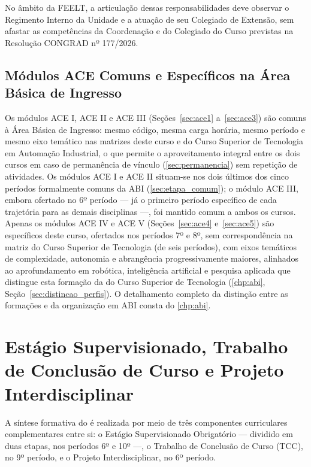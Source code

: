 No âmbito da FEELT, a articulação dessas responsabilidades deve observar o Regimento Interno da Unidade e a atuação de seu Colegiado de Extensão, sem afastar as competências da Coordenação e do Colegiado do Curso previstas na Resolução CONGRAD nº 177/2026.

\subsection{Módulos ACE Comuns e Específicos na Área Básica de Ingresso}
\label{sec:ace_abi}

Os módulos ACE I, ACE II e ACE III (Seções~\ref{sec:ace1} a~\ref{sec:ace3}) são comuns à Área Básica de Ingresso: mesmo código, mesma carga horária, mesmo período e mesmo eixo temático nas matrizes deste curso e do Curso Superior de Tecnologia em Automação Industrial, o que permite o aproveitamento integral entre os dois cursos em caso de permanência de vínculo (\autoref{sec:permanencia}\unskip) sem repetição de atividades. Os módulos ACE I e ACE II situam-se nos dois últimos dos cinco períodos formalmente comuns da ABI (\autoref{sec:etapa_comum}); o módulo ACE III, embora ofertado no 6º período — já o primeiro período específico de cada trajetória para as demais disciplinas —, foi mantido comum a ambos os cursos. Apenas os módulos ACE IV e ACE V (Seções~\ref{sec:ace4} e~\ref{sec:ace5}) são específicos deste curso, ofertados nos períodos 7º e 8º, sem correspondência na matriz do Curso Superior de Tecnologia (de seis períodos), com eixos temáticos de complexidade, autonomia e abrangência progressivamente maiores, alinhados ao aprofundamento em robótica, inteligência artificial e pesquisa aplicada que distingue esta formação da do Curso Superior de Tecnologia (\autoref{chp:abi}, Seção~\ref{sec:distincao_perfis}). O detalhamento completo da distinção entre as formações e da organização em ABI consta do \autoref{chp:abi}.

\section{Estágio Supervisionado, Trabalho de Conclusão de Curso e Projeto Interdisciplinar}
\label{sec:acc_conclusao}

A síntese formativa do \ppccurso é realizada por meio de três componentes curriculares complementares entre si: o Estágio Supervisionado Obrigatório — dividido em duas etapas, nos períodos 6º e 10º —, o Trabalho de Conclusão de Curso (TCC), no 9º período, e o Projeto Interdisciplinar, no 6º período.

